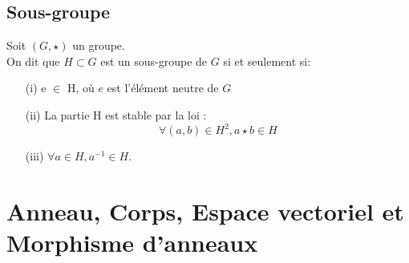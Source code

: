 \subsection{Sous-groupe}
\begin{madefinition}
	Soit $(G, \star)$ un groupe. \\
	On dit que $H \subset G$ est un sous-groupe de $G$ si et seulement si:
	\begin{enumerate}
		\item[(i)] e $\in$ H, où $e$ est l'élément neutre de $G$
		\item[(ii)] La partie H est stable par la loi :
		\[\forall (a,b) \in H^2, a \star b \in H\]
		\item[(iii)] $\forall a \in H, a^{-1} \in H$.
	\end{enumerate}
\end{madefinition}

\section{Anneau, Corps, Espace vectoriel et Morphisme d'anneaux}
